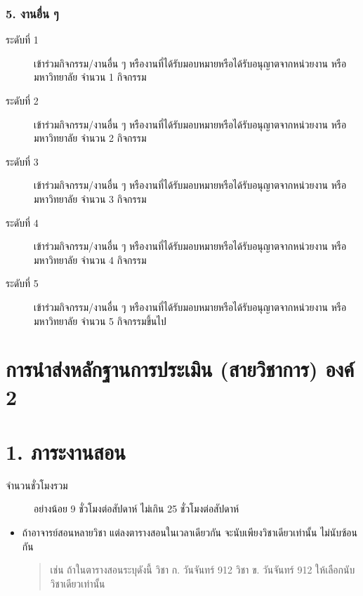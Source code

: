 \documentclass[a4paper,12pt,english]{sphinxmanual}
\begin{document}
\subsection{5. งานอื่น ๆ}
\label{\detokenize{submission_part1:id19}}\begin{description}
\item[{ระดับที่ 1}] \leavevmode
เข้าร่วมกิจกรรม/งานอื่น ๆ หรืองานที่ได้รับมอบหมายหรือได้รับอนุญาตจากหน่วยงาน หรือมหาวิทยาลัย จำนวน 1 กิจกรรม

\item[{ระดับที่ 2}] \leavevmode
เข้าร่วมกิจกรรม/งานอื่น ๆ หรืองานที่ได้รับมอบหมายหรือได้รับอนุญาตจากหน่วยงาน หรือมหาวิทยาลัย จำนวน 2 กิจกรรม

\item[{ระดับที่ 3}] \leavevmode
เข้าร่วมกิจกรรม/งานอื่น ๆ หรืองานที่ได้รับมอบหมายหรือได้รับอนุญาตจากหน่วยงาน หรือมหาวิทยาลัย จำนวน 3 กิจกรรม

\item[{ระดับที่ 4}] \leavevmode
เข้าร่วมกิจกรรม/งานอื่น ๆ หรืองานที่ได้รับมอบหมายหรือได้รับอนุญาตจากหน่วยงาน หรือมหาวิทยาลัย จำนวน 4 กิจกรรม

\item[{ระดับที่ 5}] \leavevmode
เข้าร่วมกิจกรรม/งานอื่น ๆ หรืองานที่ได้รับมอบหมายหรือได้รับอนุญาตจากหน่วยงาน หรือมหาวิทยาลัย จำนวน 5 กิจกรรมขึ้นไป

\end{description}


\chapter{การนำส่งหลักฐานการประเมิน (สายวิชาการ) องค์ 2}
\label{\detokenize{submission_part2:id1}}\label{\detokenize{submission_part2::doc}}

\chapter{1. ภาระงานสอน}
\label{\detokenize{1teaching:id1}}\label{\detokenize{1teaching::doc}}\begin{description}
\item[{จำนวนชั่วโมงรวม}] \leavevmode
อย่างน้อย 9 ชั่วโมงต่อสัปดาห์ ไม่เกิน 25 ชั่วโมงต่อสัปดาห์

\end{description}
\begin{itemize}
\item {} 
ถ้าอาจารย์สอนหลายวิชา แต่ลงตารางสอนในเวลาเดียวกัน จะนับเพียงวิชาเดียวเท่านั้น ไม่นับซ้อนกัน
\begin{quote}

เช่น ถ้าในตารางสอนระบุดังนี้
วิชา ก. วันจันทร์ 9\sphinxhyphen{}12
วิชา ข. วันจันทร์ 9\sphinxhyphen{}12
ให้เลือกนับวิชาเดียวเท่านั้น
\end{quote}

\end{itemize}
\end{document}
